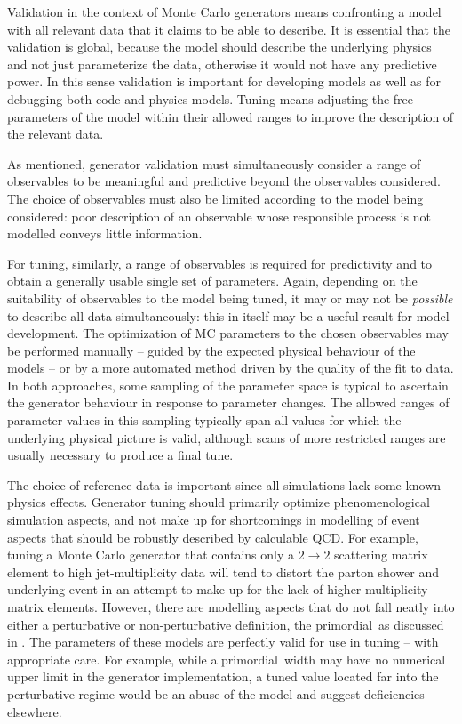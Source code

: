 
Validation in the context of Monte Carlo generators means confronting a model with all
relevant data that it claims to be able to describe. It is essential that the
validation is global, because the model should describe the underlying physics
and not just parameterize the data, otherwise it would not have any predictive
power. In this sense validation is important for developing models as well as
for debugging both code and physics models. Tuning means adjusting the free
parameters of the model within their allowed ranges to improve the description
of the relevant data.


\label{sec:tuningstrategy}

As mentioned, generator validation must simultaneously consider a range of
observables to be meaningful and predictive beyond the observables considered.
The choice of observables must also be limited according to the model being
considered: poor description of an observable whose responsible process is not
modelled conveys little information.

For tuning, similarly, a range of observables is required for predictivity and
to obtain a generally usable single set of parameters. Again, depending on the
suitability of observables to the model being tuned, it may or may not be
\emph{possible} to describe all data simultaneously: this in itself may be a
useful result for model development. The optimization of MC parameters to the
chosen observables may be performed manually -- guided by the expected physical
behaviour of the models -- or by a more automated method driven by the quality
of the fit to data. In both approaches, some sampling of the parameter space is
typical to ascertain the generator behaviour in response to parameter changes.
The allowed ranges of parameter values in this sampling typically span all
values for which the underlying physical picture is valid, although scans of
more restricted ranges are usually necessary to produce a final tune.

The choice of reference data is important since all simulations lack some known
physics effects. Generator tuning should primarily optimize phenomenological
simulation aspects, and not make up for shortcomings in modelling of event
aspects that should be robustly described by calculable QCD. For example, tuning
a Monte Carlo generator that contains only a $2 \to 2$ scattering matrix element to
high jet-multiplicity data will tend to distort the parton shower and underlying
event in an attempt to make up for the lack of higher multiplicity matrix
elements. However, there are modelling aspects that do not fall neatly into
either a perturbative or non-perturbative definition, \eg the primordial~\kt as
discussed in . The parameters of these models are perfectly
valid for use in tuning -- with appropriate care. For example, while a
primordial~\kt width may have no numerical upper limit in the generator
implementation, a tuned value located far into the perturbative regime would be
an abuse of the model and suggest deficiencies elsewhere.

